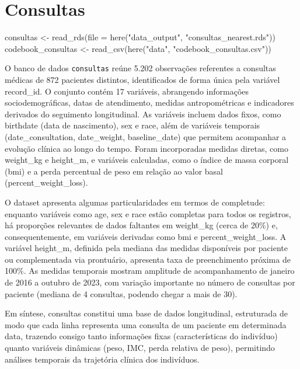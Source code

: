 \documentclass[
]{article}
\newenvironment{Shaded}{\begin{snugshade}}{\end{snugshade}}
\newcommand{\AttributeTok}[1]{\textcolor[rgb]{0.40,0.45,0.13}{#1}}
\newcommand{\FunctionTok}[1]{\textcolor[rgb]{0.28,0.35,0.67}{#1}}
\newcommand{\NormalTok}[1]{\textcolor[rgb]{0.00,0.23,0.31}{#1}}
\newcommand{\OtherTok}[1]{\textcolor[rgb]{0.00,0.23,0.31}{#1}}
\newcommand{\StringTok}[1]{\textcolor[rgb]{0.13,0.47,0.30}{#1}}
\begin{document}
\section{Consultas}\label{consultas}

\begin{Shaded}
\begin{Highlighting}[]
\NormalTok{consultas }\OtherTok{\textless{}{-}} \FunctionTok{read\_rds}\NormalTok{(}\AttributeTok{file =} \FunctionTok{here}\NormalTok{(}\StringTok{"data\_output"}\NormalTok{, }\StringTok{"consultas\_nearest.rds"}\NormalTok{))}
\NormalTok{codebook\_consultas }\OtherTok{\textless{}{-}} \FunctionTok{read\_csv}\NormalTok{(}\FunctionTok{here}\NormalTok{(}\StringTok{"data"}\NormalTok{, }\StringTok{"codebook\_consultas.csv"}\NormalTok{))}
\end{Highlighting}
\end{Shaded}

O banco de dados \texttt{consultas} reúne 5.202 observações referentes a
consultas médicas de 872 pacientes distintos, identificados de forma
única pela variável record\_id. O conjunto contém 17 variáveis,
abrangendo informações sociodemográficas, datas de atendimento, medidas
antropométricas e indicadores derivados do seguimento longitudinal. As
variáveis incluem dados fixos, como birthdate (data de nascimento), sex
e race, além de variáveis temporais (date\_consultation, date\_weight,
baseline\_date) que permitem acompanhar a evolução clínica ao longo do
tempo. Foram incorporadas medidas diretas, como weight\_kg e height\_m,
e variáveis calculadas, como o índice de massa corporal (bmi) e a perda
percentual de peso em relação ao valor basal (percent\_weight\_loss).

O dataset apresenta algumas particularidades em termos de completude:
enquanto variáveis como age, sex e race estão completas para todos os
registros, há proporções relevantes de dados faltantes em weight\_kg
(cerca de 20\%) e, consequentemente, em variáveis derivadas como bmi e
percent\_weight\_loss. A variável height\_m, definida pela mediana das
medidas disponíveis por paciente ou complementada via prontuário,
apresenta taxa de preenchimento próxima de 100\%. As medidas temporais
mostram amplitude de acompanhamento de janeiro de 2016 a outubro de
2023, com variação importante no número de consultas por paciente
(mediana de 4 consultas, podendo chegar a mais de 30).

Em síntese, consultas constitui uma base de dados longitudinal,
estruturada de modo que cada linha representa uma consulta de um
paciente em determinada data, trazendo consigo tanto informações fixas
(características do indivíduo) quanto variáveis dinâmicas (peso, IMC,
perda relativa de peso), permitindo análises temporais da trajetória
clínica dos indivíduos.
\end{document}
